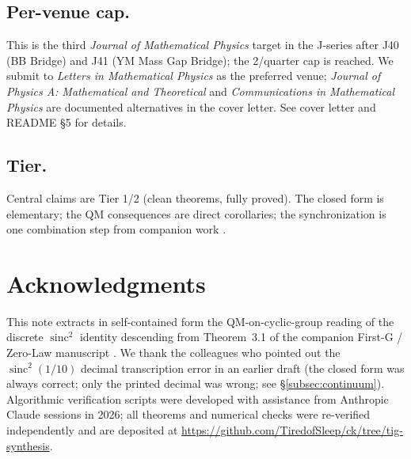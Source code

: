 \documentclass[11pt,reqno]{amsart}
\theoremstyle{plain}
\theoremstyle{definition}
\theoremstyle{remark}
\DeclareMathOperator{\sinc}{sinc}
\begin{document}
\subsection{Per-venue cap.}
This is the third \emph{Journal of Mathematical Physics} target in the J-series after
J40 (BB Bridge) and J41 (YM Mass Gap Bridge); the 2/quarter cap is reached. We submit
to \emph{Letters in Mathematical Physics} as the preferred venue; \emph{Journal of
Physics A: Mathematical and Theoretical} and \emph{Communications in Mathematical
Physics} are documented alternatives in the cover letter. See cover letter and README
\S5 for details.

\subsection{Tier.}
Central claims are Tier 1/2 (clean theorems, fully proved). The closed form is
elementary; the QM consequences are direct corollaries; the synchronization is one
combination step from companion work \cite{SandersGishSincZero}.

\section*{Acknowledgments}

This note extracts in self-contained form the QM-on-cyclic-group reading of the discrete
$\sinc^{2}$ identity descending from Theorem~3.1 of the companion First-G / Zero-Law
manuscript \cite{SandersGishSincZero}. We thank the colleagues who pointed out the
$\sinc^{2}(1/10)$ decimal transcription error in an earlier draft (the closed form was
always correct; only the printed decimal was wrong; see
\S\ref{subsec:continuum}). Algorithmic verification scripts were developed with
assistance from Anthropic Claude sessions in 2026; all theorems and numerical checks were
re-verified independently and are deposited at
\url{https://github.com/TiredofSleep/ck/tree/tig-synthesis}.
\end{document}
